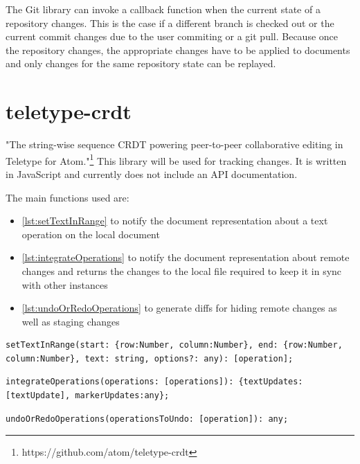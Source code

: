 The Git library can invoke a callback function when the current state of a repository changes. This is the case if a different branch is checked out or the current commit changes due to the user commiting or a git pull. Because once the repository changes, the appropriate changes have to be applied to documents and only changes for the same repository state can be replayed.

\section{teletype-crdt}

"The string-wise sequence CRDT powering peer-to-peer collaborative editing in Teletype for Atom."\footnote{https://github.com/atom/teletype-crdt}
This library will be used for tracking changes. It is written in JavaScript and currently does not include an API documentation.

The main functions used are: 

\begin{itemize}
    \item \ref{lst:setTextInRange} to notify the document representation about a text operation on the local document
    \item \ref{lst:integrateOperations} to notify the document representation about remote changes and returns the changes to the local file required to keep it in sync with other instances
    \item \ref{lst:undoOrRedoOperations} to generate diffs for hiding remote changes as well as staging changes
\end{itemize}


\begin{lstlisting}[label={lst:setTextInRange}, caption=teletype-crdt setTextInRange]
setTextInRange(start: {row:Number, column:Number}, end: {row:Number, column:Number}, text: string, options?: any): [operation];
\end{lstlisting}

\begin{lstlisting}[label={lst:integrateOperations}, caption=teletype-crdt integrateOperations]
integrateOperations(operations: [operations]): {textUpdates:[textUpdate], markerUpdates:any};
\end{lstlisting}

\begin{lstlisting}[label={lst:undoOrRedoOperations}, caption=teletype-crdt undoOrRedoOperations]
undoOrRedoOperations(operationsToUndo: [operation]): any;
\end{lstlisting}

